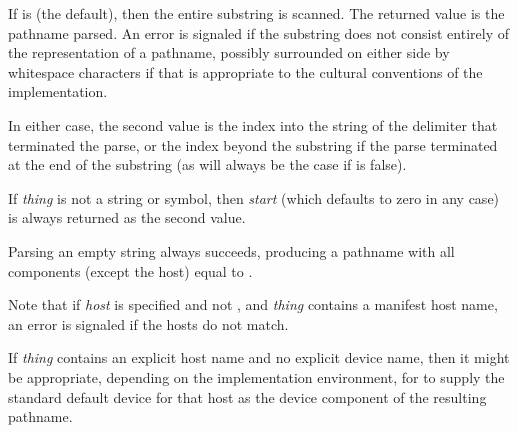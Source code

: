 \begin{defun}[Function]
If  is {\false} (the default),
then the entire substring is scanned.
The returned value is the pathname parsed.
An error is signaled if the substring does not consist entirely of
the representation of a pathname, possibly surrounded on either side by
whitespace characters if that is appropriate to the cultural conventions
of the implementation.

In either case, the second value is the index into the string of the delimiter
that terminated the parse, or the index beyond the substring if the
parse terminated at the end of the substring (as will always be the case if
 is false).

If {\it thing} is not a string or symbol, then {\it start} (which defaults
to zero in any case) is always returned as the second value.

Parsing an empty string always succeeds, producing a pathname with
all components (except the host) equal to {\nil}.

Note that if {\it host} is specified and not {\nil},
and {\it thing} contains a manifest host name, an
error is signaled if the hosts do not match.

If {\it thing} contains an explicit host name and no explicit device name,
then it might be appropriate, depending on the
implementation environment, for  to supply the
standard default device for that host as the device component
of the resulting pathname.
\end{defun}

\newpage

